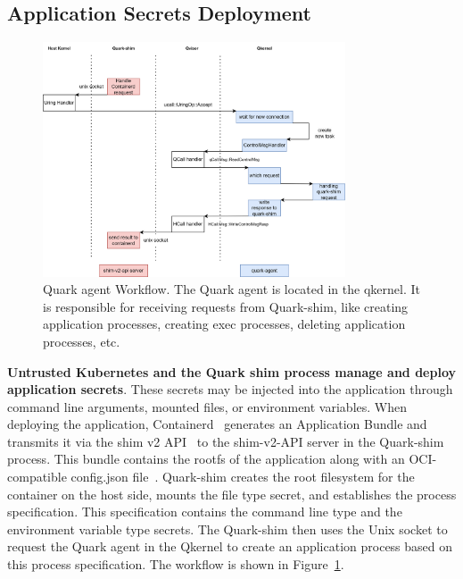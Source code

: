 \subsection{Application Secrets Deployment}
\begin{figure}[H]
    \centering
    \includegraphics[width=0.8\textwidth]{images/quark-agent-work-flow.png}
    \caption[Quark Agent Workflow]{Quark agent Workflow. The Quark agent is located in the qkernel. It is responsible for receiving requests from Quark-shim, like creating application processes, creating exec processes, deleting application processes, etc.}
    \label{fig:quark_agent_work_flow}
\end{figure}


\textbf{Untrusted Kubernetes and the Quark shim process manage and deploy application secrets}. 
These secrets may be injected into the application through command line arguments, mounted files, or environment variables. When deploying the application, Containerd~\cite*{containerd} generates an Application Bundle and transmits it via the 
shim v2 API~\cite*{shim_v2} to the shim-v2-API server in the Quark-shim process. This bundle contains the rootfs of the application along with an OCI-compatible config.json file~\cite*{oci-runtime-spec}. Quark-shim creates the root filesystem for 
the container on the host side, mounts the file type secret, and establishes the process specification. This specification contains the command line type and the environment variable type secrets.  The Quark-shim then uses the Unix socket to 
request the Quark agent in the Qkernel to create an application process based on this process specification. The workflow is shown in Figure~\ref*{fig:quark_agent_work_flow}.


